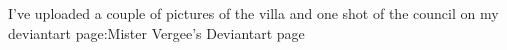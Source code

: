 I've uploaded a couple of pictures of the villa and one shot of the council on my deviantart page:Mister Vergee's Deviantart page 